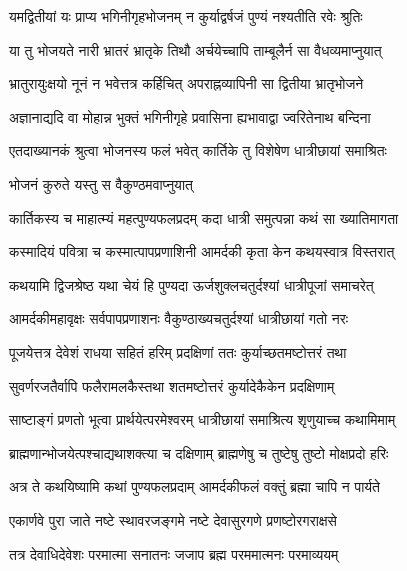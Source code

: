 \twolineshloka
{यमद्वितीयां यः प्राप्य भगिनीगृहभोजनम्}
{न कुर्याद्वर्षजं पुण्यं नश्यतीति रवेः श्रुतिः} %

\twolineshloka
{या तु भोजयते नारी भ्रातरं भ्रातृके तिथौ}
{अर्चयेच्चापि ताम्बूलैर्न सा वैधव्यमाप्नुयात्} %

\twolineshloka
{भ्रातुरायुःक्षयो नूनं न भवेत्तत्र कर्हिचित्}
{अपराह्नव्यापिनी सा द्वितीया भ्रातृभोजने} %

\twolineshloka
{अज्ञानाद्यदि वा मोहान्न भुक्तं भगिनीगृहे}
{प्रवासिना ह्यभावाद्वा ज्वरितेनाथ बन्दिना} %

\twolineshloka
{एतदाख्यानकं श्रुत्वा भोजनस्य फलं भवेत्}
{कार्तिके तु विशेषेण धात्रीछायां समाश्रितः} %


\onelineshloka
{भोजनं कुरुते यस्तु स वैकुण्ठमवाप्नुयात्} %





\twolineshloka
{कार्तिकस्य च माहात्म्यं महत्पुण्यफलप्रदम्}
{कदा धात्री समुत्पन्ना कथं सा ख्यातिमागता} %

\twolineshloka
{कस्मादियं पवित्रा च कस्मात्पापप्रणाशिनी}
{आमर्दकी कृता केन कथयस्वात्र विस्तरात्} %


\twolineshloka
{कथयामि द्विजश्रेष्ठ यथा चेयं हि पुण्यदा}
{ऊर्जशुक्लचतुर्दश्यां धात्रीपूजां समाचरेत्} %

\twolineshloka
{आमर्दकीमहावृक्षः सर्वपापप्रणाशनः}
{वैकुण्ठाख्यचतुर्दश्यां धात्रीछायां गतो नरः} %

\twolineshloka
{पूजयेत्तत्र देवेशं राधया सहितं हरिम्}
{प्रदक्षिणां ततः कुर्याच्छतमष्टोत्तरं तथा} %

\twolineshloka
{सुवर्णरजतैर्वापि फलैरामलकैस्तथा}
{शतमष्टोत्तरं कुर्यादेकैकेन प्रदक्षिणाम्} %

\twolineshloka
{साष्टाङ्गं प्रणतो भूत्वा प्रार्थयेत्परमेश्वरम्}
{धात्रीछायां समाश्रित्य शृणुयाच्च कथामिमाम्} %

\twolineshloka
{ब्राह्मणान्भोजयेत्पश्चाद्यथाशक्त्या च दक्षिणाम्}
{ब्राह्मणेषु च तुष्टेषु तुष्टो मोक्षप्रदो हरिः} %

\twolineshloka
{अत्र ते कथयिष्यामि कथां पुण्यफलप्रदाम्}
{आमर्दकीफलं वक्तुं ब्रह्मा चापि न पार्यते} %


\twolineshloka
{एकार्णवे पुरा जाते नष्टे स्थावरजङ्गमे}
{नष्टे देवासुरगणे प्रणष्टोरगराक्षसे} %

\twolineshloka
{तत्र देवाधिदेवेशः परमात्मा सनातनः}
{जजाप ब्रह्म परममात्मनः परमाव्ययम्} %

